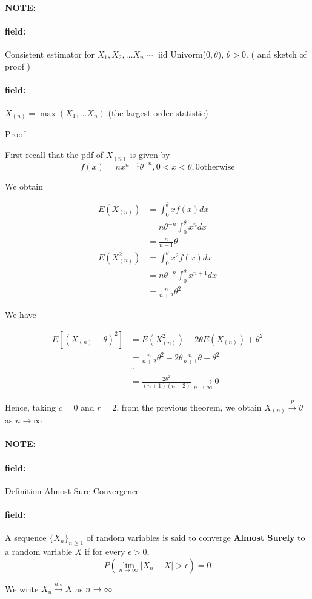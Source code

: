 \documentclass[12pt]{article}
\newenvironment{note}{\paragraph{NOTE:}}{}
\newenvironment{field}{\paragraph{field:}}{}
\begin{document}
\begin{note}
  \begin{field}
    Consistent estimator for $X_1, X_2, \ldots X_n \sim $ iid Univorm($0,\theta$), $\theta > 0$. ( and sketch of proof )
  \end{field}
  \begin{field}
    $X_{(n)} = \max(X_1, \ldots X_n)$ (the largest order statistic)

    Proof

    First recall that the pdf of $X_{(n)}$ is given by $$f(x) = nx^{n-1} \theta^{-n}, 0 < x < \theta, 0 \text{otherwise} $$

    We obtain

    \begin{align*}
      E(X_{(n)}) &= \int_{0}^\theta x f(x) dx \\
      &= n \theta^{-n} \int_0^\theta x^n dx \\
      &= \frac{n}{n-1}\theta\\
      E(X_{(n)}^2) &= \int_0^\theta x^2f(x)dx \\
      &= n\theta^{-n} \int_0^\theta x^{n+1}dx \\
      &= \frac{n}{n + 2} \theta^2
    \end{align*}

    We have

    \begin{align*}
      E[(X_{(n)} - \theta)^2] &= E(X_{(n)}^2) - 2\theta E(X_{(n)}) + \theta^2 \\
      &= \frac{n}{n + 2}\theta^2 - 2\theta \frac{n}{n + 1} \theta + \theta^2\\
      &\cdots\\
      &= \frac{2\theta^2}{(n + 1)(n + 2)} \underset{n \to \infty}{\to} 0
    \end{align*}

    Hence, taking $c = 0$ and $r = 2$, from the previous theorem, we obtain $X_{(n)} \overset{p}{\to} \theta$ as $n \to \infty$

  \end{field}
\end{note}



\begin{note}
  \begin{field}
    Definition Almost Sure Convergence
  \end{field}
  \begin{field}
    A sequence $\{X_n\}_{n \geq 1}$ of random variables is said to converge \textbf{Almost Surely} to a random variable $X$ if for every $\epsilon > 0$,
    $$ P(\lim_{n \to \infty}|X_n - X| > \epsilon) = 0$$

    We write $X_n \overset{a.s}{\to} X$ as $n \to \infty$

  \end{field}
\end{note}
\end{document}
